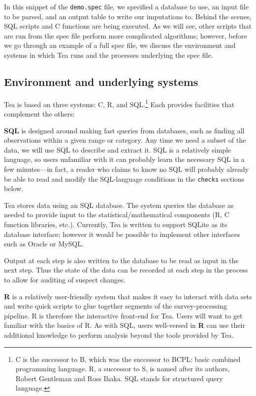 \documentclass{article}
\begin{document}
In this snippet of the {\tt demo.spec} file, we specified a database to use, an input
file to be parsed, and an output table to write our imputations to. Behind the scenes,
SQL scripts and C functions are being executed. As we will see, other scripts that
are run from the spec file perform more complicated algorithms; however, before we
go through an example of a full spec file, we discuss the environment and systems in
which Tea runs and the processes underlying the spec file.

\subsection{Environment and underlying systems}
Tea is based on three systems: C, R, and SQL.\footnote{C is the successor to B, which
was the successor to BCPL: basic combined programming language. R, a successor to S,
is named after its authors, Robert Gentleman and Ross Ihaka. SQL stands for structured
query language.} Each provides facilities that complement the others:

{\bf SQL} is designed around making fast queries from databases, such as finding all
observations within a given range or category. Any time we need a subset of the data,
we will use SQL to describe and extract it. SQL is a relatively simple language, so
users unfamiliar with it can probably learn the necessary SQL in a few minutes---in
fact, a reader who claims to know no SQL will probably already be able to read and
modify the SQL-language conditions in the {\tt checks} sections below.

Tea stores data using an SQL database. The system queries the database as needed to
provide input to the statistical/mathematical components (R, C function libraries,
etc.).  Currently, Tea is written to support SQLite as its database interface; however
it would be possible to implement other interfaces such as Oracle or MySQL.

Output at each step is also written to the database to be read as input in the next
step. Thus the state of the data can be recorded at each step in the process to allow
for auditing of suspect changes.

{\bf R} is a relatively user-friendly system that makes it easy to interact with data
sets and write quick scripts to glue together segments of the survey-processing pipeline.
R is therefore the interactive front-end for Tea. Users will want to get familiar with
the basics of R.  As with SQL, users well-versed in \textbf{R} can use their additional
knowledge to perform analysis beyond the tools provided by Tea.
\end{document}
